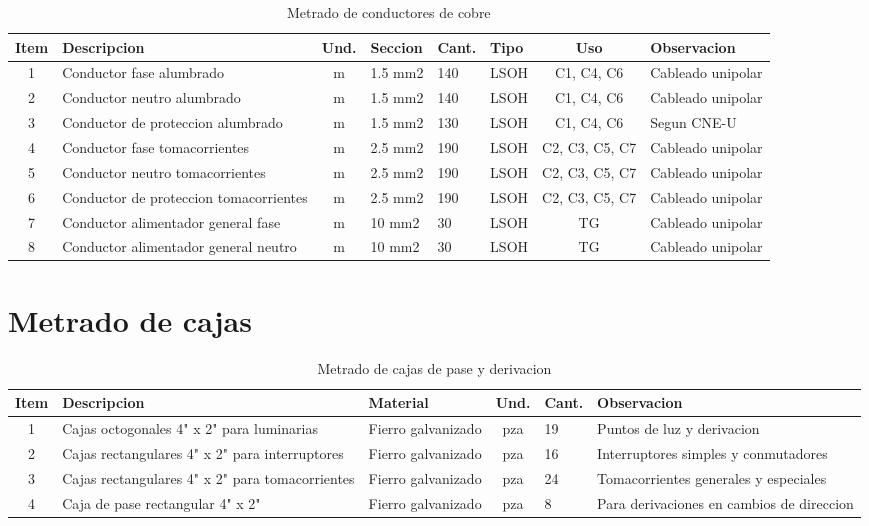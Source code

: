 \begin{landscape}
\begin{table}[H]
\centering
\small
\caption{Metrado de conductores de cobre}
\label{tab:metrado-conductores}
\begin{tabularx}{\textwidth}{c L{4.5cm} c L{1.8cm} L{1.8cm} L{1.8cm} c Y}
\toprule
\textbf{Item} & \textbf{Descripcion} & \textbf{Und.} & \textbf{Seccion} & \textbf{Cant.} & \textbf{Tipo} & \textbf{Uso} & \textbf{Observacion} \\
 & Conductor fase alumbrado & m & 1.5 mm2 & 140 & LSOH & C1, C4, C6 & Cableado unipolar \\
2 & Conductor neutro alumbrado & m & 1.5 mm2 & 140 & LSOH & C1, C4, C6 & Cableado unipolar \\
3 & Conductor de proteccion alumbrado & m & 1.5 mm2 & 130 & LSOH & C1, C4, C6 & Segun CNE-U \\
4 & Conductor fase tomacorrientes & m & 2.5 mm2 & 190 & LSOH & C2, C3, C5, C7 & Cableado unipolar \\
5 & Conductor neutro tomacorrientes & m & 2.5 mm2 & 190 & LSOH & C2, C3, C5, C7 & Cableado unipolar \\
6 & Conductor de proteccion tomacorrientes & m & 2.5 mm2 & 190 & LSOH & C2, C3, C5, C7 & Cableado unipolar \\
7 & Conductor alimentador general fase & m & 10 mm2 & 30 & LSOH & TG & Cableado unipolar \\
8 & Conductor alimentador general neutro & m & 10 mm2 & 30 & LSOH & TG & Cableado unipolar \\
\bottomrule
\end{tabularx}
\end{table}
\end{landscape}

\clearpage

\section{Metrado de cajas}

\begin{table}[H]
\centering
\small
\caption{Metrado de cajas de pase y derivacion}
\label{tab:metrado-cajas}
\begin{tabularx}{\textwidth}{c L{4.5cm} L{2.5cm} c L{2.5cm} Y}
\toprule
\textbf{Item} & \textbf{Descripcion} & \textbf{Material} & \textbf{Und.} & \textbf{Cant.} & \textbf{Observacion} \\
 & Cajas octogonales 4" x 2" para luminarias & Fierro galvanizado & pza & 19 & Puntos de luz y derivacion \\
2 & Cajas rectangulares 4" x 2" para interruptores & Fierro galvanizado & pza & 16 & Interruptores simples y conmutadores \\
3 & Cajas rectangulares 4" x 2" para tomacorrientes & Fierro galvanizado & pza & 24 & Tomacorrientes generales y especiales \\
4 & Caja de pase rectangular 4" x 2" & Fierro galvanizado & pza & 8 & Para derivaciones en cambios de direccion \\
\bottomrule
\end{tabularx}
\end{table}

